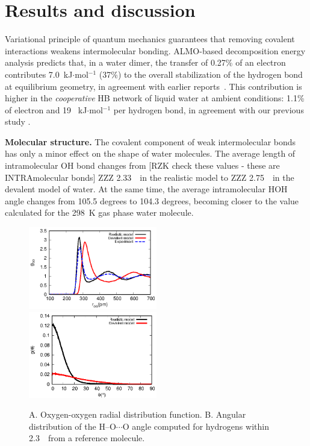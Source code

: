 \documentclass[aps,prl,reprint,amsmath,amssymb]{revtex4-1}
\begin{document}
\section{Results and discussion}

Variational principle of quantum mechanics guarantees that removing covalent interactions weakens intermolecular bonding. 
ALMO-based decomposition energy analysis predicts that, in a water dimer, the transfer of 0.27\% of an electron contributes  7.0~kJ$\cdot$mol$^{-1}$ (37\%) to the overall stabilization of the hydrogen bond at equilibrium geometry, in agreement with earlier reports~\cite{stevens1987frozen,chen1996energy,piquemal2005csov,RZK-khaliullin2009dimer}. 
This contribution is higher in the \emph{cooperative} HB network of liquid water at ambient conditions: 1.1\% of electron and 19 ~kJ$\cdot$mol$^{-1}$ per hydrogen bond, in agreement with our previous study \cite{kuhne2014nature}.

\textbf{Molecular structure.} The covalent component of weak intermolecular bonds has only a minor effect on the shape of water molecules. 
The average length of intramolecular OH bond changes from [RZK check these values - these are INTRAmolecular bonds] \new ZZZ 2.33\old~\Ang\ in the realistic model to \new ZZZ 2.75\old~\Ang\ in the devalent model of water. 
At the same time, the average intramolecular HOH angle changes from 105.5 degrees to 104.3 degrees, becoming closer to the value calculated for the 298~K gas phase water molecule.

\begin{figure}
\includegraphics[width=0.5\textwidth]{new_rdf}
\includegraphics[width=0.5\textwidth]{new_adf}
\caption{A. Oxygen-oxygen radial distribution function. B. Angular distribution of the H--O$\cdots$O angle computed for hydrogens within 2.3~\Ang\ from a reference molecule.} \label{Fig:RDF}
\end{figure}
\end{document}

